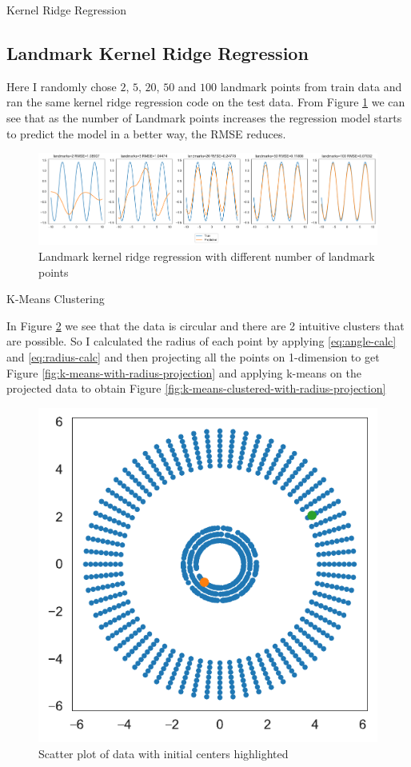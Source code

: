 \documentclass[a4paper,11pt]{article}
\begin{document}
\begin{mlsolution}
\begin{section}{Kernel Ridge Regression}
        \subsection{Landmark Kernel Ridge Regression}
        Here I randomly chose $2$, $5$, $20$, $50$ and $100$ landmark points from train data and ran the same kernel ridge regression code on the test data. From Figure \ref{fig:landmark-kernel-rdge-regression} we can see that as the number of Landmark points increases the regression model starts to predict the model in a better way, the RMSE reduces.
        \begin{figure}[h]
            \includegraphics[width=\textwidth]{images/landmark-kernel-ridge-regression.pdf}
            \caption{Landmark kernel ridge regression with different number of landmark points}
            \label{fig:landmark-kernel-rdge-regression}
        \end{figure}
    \end{section}

    \begin{section}{K-Means Clustering}

        In Figure \ref{fig:k-means-initial-plot} we see that the data is circular and there are 2 intuitive clusters that are possible. So I calculated the radius of each point by applying \ref{eq:angle-calc} and \ref{eq:radius-calc} and then projecting all the points on 1-dimension to get Figure \ref{fig:k-means-with-radius-projection} and applying k-means on the projected data to obtain Figure \ref{fig:k-means-clustered-with-radius-projection}
        \begin{figure}[h]
            \centering
            \includegraphics[width=.3\textwidth]{images/k-means-initial-plot.pdf}
            \caption{Scatter plot of data with initial centers highlighted}
            \label{fig:k-means-initial-plot}
        \end{figure}


\end{section}
\end{mlsolution}
\end{document}
